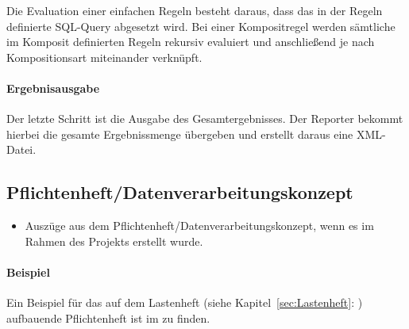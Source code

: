 Die Evaluation einer einfachen Regeln besteht daraus, dass das in der Regeln definierte \acs{SQL}-Query abgesetzt wird. Bei einer Kompositregel werden sämtliche im Komposit definierten Regeln rekursiv evaluiert und anschließend je nach Kompositionsart miteinander verknüpft.

\paragraph{Ergebnisausgabe}
Der letzte Schritt ist die Ausgabe des Gesamtergebnisses. Der Reporter bekommt hierbei die gesamte Ergebnissmenge übergeben und erstellt daraus eine \acs{XML}-Datei.


\subsection{Pflichtenheft/Datenverarbeitungskonzept}
\label{sec:Pflichtenheft}
\begin{itemize}
	\item Auszüge aus dem Pflichtenheft/Datenverarbeitungskonzept, wenn es im Rahmen des Projekts erstellt wurde.
\end{itemize}

\paragraph{Beispiel}
Ein Beispiel für das auf dem Lastenheft (siehe Kapitel~\ref{sec:Lastenheft}: ) aufbauende Pflichtenheft ist im  zu finden.


